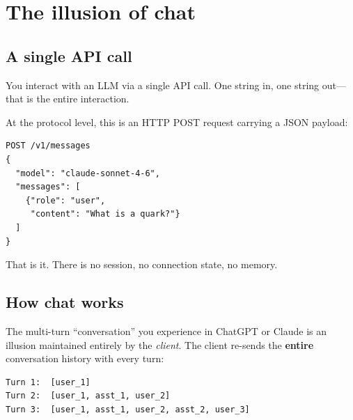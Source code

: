
\section{The illusion of chat}\label{sec:chat-illusion}

\subsection{A single API call}

You interact with an LLM via a single API call.  One string in, one
string out---that is the entire interaction.

\begin{center}
\end{center}

At the protocol level, this is an HTTP POST request carrying a JSON
payload:

\begin{lstlisting}
POST /v1/messages
{
  "model": "claude-sonnet-4-6",
  "messages": [
    {"role": "user",
     "content": "What is a quark?"}
  ]
}
\end{lstlisting}

That is it.  There is no session, no connection state, no memory.

\subsection{How chat works}

The multi-turn ``conversation'' you experience in ChatGPT or Claude is
an illusion maintained entirely by the \emph{client}.  The client
re-sends the \textbf{entire} conversation history with every turn:

\begin{lstlisting}
Turn 1:  [user_1]
Turn 2:  [user_1, asst_1, user_2]
Turn 3:  [user_1, asst_1, user_2, asst_2, user_3]
\end{lstlisting}

